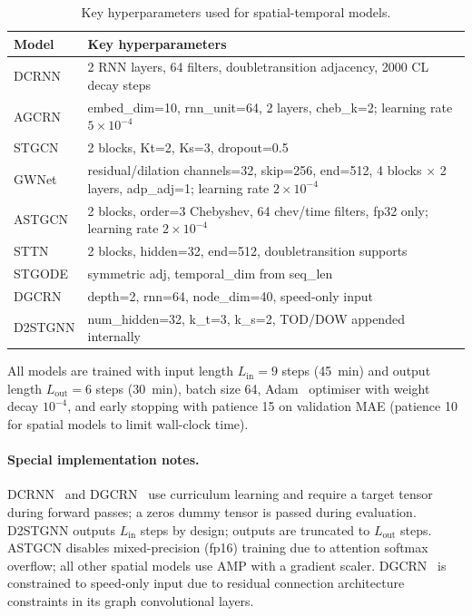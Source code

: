 \documentclass[a4paper]{cas-sc}
\begin{document}
\begin{table}[h]
\centering
\caption{Key hyperparameters used for spatial-temporal models.}
\label{tab:hyperparams_models}
\small
\begin{tabular}{lp{9cm}}
\toprule
Model & Key hyperparameters \\
\midrule
DCRNN    & 2 RNN layers, 64 filters, doubletransition adjacency,
           2000 CL decay steps \\
AGCRN    & embed\_dim=10, rnn\_unit=64, 2 layers, cheb\_k=2;
           learning rate $5\times10^{-4}$ \\
STGCN    & 2 blocks, Kt=2, Ks=3, dropout=0.5 \\
GWNet    & residual/dilation channels=32, skip=256, end=512,
           4 blocks $\times$ 2 layers, adp\_adj=1;
           learning rate $2\times10^{-4}$ \\
ASTGCN   & 2 blocks, order=3 Chebyshev, 64 chev/time filters,
           fp32 only; learning rate $2\times10^{-4}$ \\
STTN     & 2 blocks, hidden=32, end=512, doubletransition supports \\
STGODE   & symmetric adj, temporal\_dim from seq\_len \\

DGCRN    & depth=2, rnn=64, node\_dim=40, speed-only input \\
D2STGNN  & num\_hidden=32, k\_t=3, k\_s=2, TOD/DOW appended internally \\
\bottomrule
\end{tabular}
\end{table}

All models are trained with input length $L_{\mathrm{in}} = 9$ steps
(45~min) and output length $L_{\mathrm{out}} = 6$ steps (30~min),
batch size 64, Adam~\citep{kingma2015adam} optimiser with weight decay $10^{-4}$,
and early stopping with patience 15 on validation MAE
(patience 10 for spatial models to limit wall-clock time).

\paragraph{Special implementation notes.}
DCRNN~\citep{li2018dcrnn} and DGCRN~\citep{li2023dgcrn} use
curriculum learning and require a target tensor during forward passes;
a zeros dummy tensor is passed during evaluation.
D2STGNN outputs $L_{\mathrm{in}}$ steps by design; outputs are
truncated to $L_{\mathrm{out}}$ steps.
ASTGCN disables mixed-precision (fp16) training
due to attention softmax overflow; all other spatial models
use AMP with a gradient scaler.
DGCRN~\citep{li2023dgcrn} is constrained to speed-only input
due to residual connection architecture constraints in its graph
convolutional layers.
\end{document}
